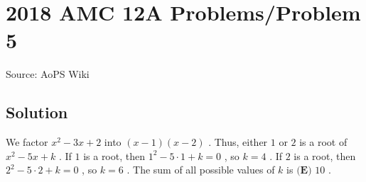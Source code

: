 \documentclass[12pt]{article}
\begin{document}
\section*{{2018 AMC 12A Problems/Problem 5}}
Source: AoPS Wiki

\subsection*{Solution}
We factor $x^2-3x+2$ into $(x-1)(x-2)$ . Thus, either $1$ or $2$ is a root of $x^2-5x+k$ . If $1$ is a root, then $1^2-5\cdot1+k=0$ , so $k=4$ . If $2$ is a root, then $2^2-5\cdot2+k=0$ , so $k=6$ . The sum of all possible values of $k$ is $\boxed{\textbf{(E) }10}$ .
\end{document}
